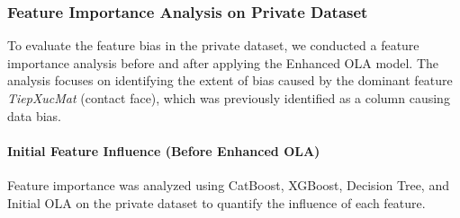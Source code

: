 \documentclass[conference]{IEEEtran}
\begin{document}
\begin{table}[H]
\centering
\caption{5-fold cross-validation performance of enhanced OLA (PCA + OLA with TiepXucMat control) on the private dataset.}
\label{tab:enhanced_ola_cv}
\end{table}



\subsubsection{Feature Importance Analysis on Private Dataset}

To evaluate the feature bias in the private dataset, we conducted a feature importance analysis before and after applying the Enhanced OLA model. The analysis focuses on identifying the extent of bias caused by the dominant feature \textit{TiepXucMat} (contact face), which was previously identified as a column causing data bias.

\paragraph{Initial Feature Influence (Before Enhanced OLA)}
Feature importance was analyzed using CatBoost, XGBoost, Decision Tree, and Initial OLA on the private dataset to quantify the influence of each feature.
\end{document}
